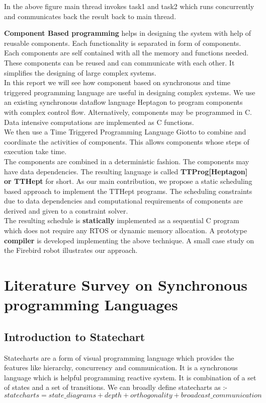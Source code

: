 \documentclass[16pt]{report}
\begin{document}
In the above figure main thread invokes task1 and task2 which runs concurrently and communicates back the result back to main thread.


\textbf{Component Based programming} helps in designing the system with help of reusable components. Each functionality is separated in form of components. Each components are self contained with all the memory and functions needed. These components can be reused and can communicate with each other. It simplifies the designing of large complex systems.\\
In this report we will see how component based on synchronous and time triggered programming language are useful in designing complex systems.
We use an existing synchronous dataflow language Heptagon to program components with complex control flow. Alternatively, components may be programmed in C. Data intensive computations are implemented as C functions. \\
We then use a Time Triggered Programming Language Giotto to combine and coordinate the activities of components. This allows components whose steps of execution take time. \\
The components are combined in a deterministic fashion. The components may have data dependencies. The resulting language is called \textbf{TTProg[Heptagon] or TTHept} for short. As our main contribution, we propose a static scheduling based approach to implement the TTHept programs. The scheduling constraints due to data dependencies and computational requirements of components are derived and given to a constraint solver. \\
The resulting schedule is \textbf{statically} implemented as a sequential C program which does not require any RTOS or dynamic memory allocation. A prototype \textbf{compiler} is developed implementing the above technique.
A small case study on the Firebird robot illustrates our approach.


\chapter{Literature Survey on Synchronous programming Languages}


\section{Introduction to Statechart}

Statecharts are a form of visual programming language which provides the features like hierarchy, concurrency and communication. It is a synchronous language which is helpful programming reactive system. It is combination of a set of states and a set of transitions. We can broadly define statecharts as :-
\begin{equation}
    statecharts = state\_diagrams + depth + orthogonality +broadcast\_communication
\end{equation}{}
\end{document}
